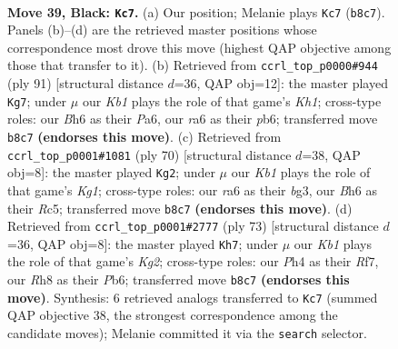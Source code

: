 \documentclass[11pt]{article}
\begin{document}
\clearpage

\begin{figure}[p]\centering
\begin{subfigure}{0.46\textwidth}\centering
\resizebox{\linewidth}{!}{%
\newchessgame
\chessboard[
  setfen={1k5r/5P2/R1P3Bb/5R2/1P4rp/8/5K2/8 b - - 0 39},
  showmover=false,
  pgfstyle=straightmove, color=movearrow, markmove={b8-c7}
]}
\caption{}
\end{subfigure}\hfill
\begin{subfigure}{0.46\textwidth}\centering
\resizebox{\linewidth}{!}{%
\newchessgame
\chessboard[
  setfen={3r3k/3P4/pP2Brp1/7p/8/7P/6P1/1R5K b - - 0 46},
  showmover=false,
  pgfstyle=straightmove, color=movearrow, markmove={h8-g7}
]}
\caption{}
\end{subfigure}
\\[4pt]
\begin{subfigure}{0.46\textwidth}\centering
\resizebox{\linewidth}{!}{%
\newchessgame
\chessboard[
  setfen={1r4k1/5b1p/8/2R2B2/1p6/6bP/8/3R2K1 w - - 1 36},
  showmover=false,
  pgfstyle=straightmove, color=movearrow, markmove={g1-g2}
]}
\caption{}
\end{subfigure}\hfill
\begin{subfigure}{0.46\textwidth}\centering
\resizebox{\linewidth}{!}{%
\newchessgame
\chessboard[
  setfen={8/p4rk1/1p6/7P/r7/4R1K1/P2R1P2/8 b - - 2 37},
  showmover=false,
  pgfstyle=straightmove, color=movearrow, markmove={g7-h7}
]}
\caption{}
\end{subfigure}
\caption{\textbf{Move 39, Black: \texttt{Kc7}.} (a) Our position; Melanie plays \texttt{Kc7} (\texttt{b8c7}). Panels (b)--(d) are the retrieved master positions whose correspondence most drove this move (highest QAP objective among those that transfer to it). (b) Retrieved from \texttt{ccrl\_top\_p0000\#944} (ply 91) [structural distance $d$=36, QAP obj=12]: the master played \texttt{Kg7}; under $\mu$ our \emph{Kb1} plays the role of that game's \emph{Kh1}; cross-type roles: our \emph{B}h6 as their \emph{P}a6, our \emph{r}a6 as their \emph{p}b6; transferred move \texttt{b8c7} \textbf{(endorses this move)}. (c) Retrieved from \texttt{ccrl\_top\_p0001\#1081} (ply 70) [structural distance $d$=38, QAP obj=8]: the master played \texttt{Kg2}; under $\mu$ our \emph{Kb1} plays the role of that game's \emph{Kg1}; cross-type roles: our \emph{r}a6 as their \emph{b}g3, our \emph{B}h6 as their \emph{R}c5; transferred move \texttt{b8c7} \textbf{(endorses this move)}. (d) Retrieved from \texttt{ccrl\_top\_p0001\#2777} (ply 73) [structural distance $d$=36, QAP obj=8]: the master played \texttt{Kh7}; under $\mu$ our \emph{Kb1} plays the role of that game's \emph{Kg2}; cross-type roles: our \emph{P}h4 as their \emph{R}f7, our \emph{R}h8 as their \emph{P}b6; transferred move \texttt{b8c7} \textbf{(endorses this move)}. Synthesis: 6 retrieved analogs transferred to \texttt{Kc7} (summed QAP objective 38, the strongest correspondence among the candidate moves); Melanie committed it via the \texttt{search} selector.}
\label{fig:thought-m77}
\end{figure}
\end{document}
